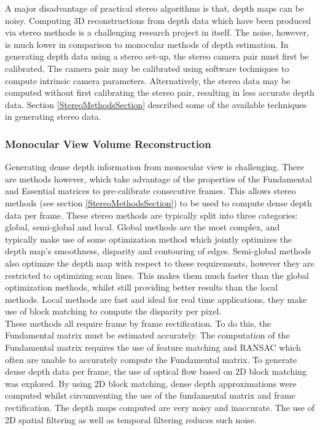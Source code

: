 A major disadvantage of practical stereo algorithms is that, depth maps can be noisy. Computing 3D reconstructions from depth data which have been produced via stereo methods is a challenging research project in itself. The noise, however, is much lower in comparison to monocular methods of depth estimation. In generating depth data using a stereo set-up, the stereo camera pair must first be calibrated. The camera pair may be calibrated using software techniques to compute intrinsic camera parameters. Alternatively, the stereo data may be computed without first calibrating the stereo pair, resulting in less accurate depth data. Section \ref{StereoMethodsSection} described some of the available techniques in generating stereo data. \\

\subsubsection{Monocular View Volume Reconstruction}
\label{subsec:MVVRMethodology}

Generating dense depth information from monocular view is challenging. There are methods however, which take advantage of the properties of the Fundamental and Essential matrices to pre-calibrate consecutive frames. This allows stereo methods (see section \ref{StereoMethodsSection}) to be used to compute dense depth data per frame. These stereo methods are typically split into three categories: global, semi-global and local. Global methods are the most complex, and typically make use of some optimization method which jointly optimizes the depth map's smoothness, disparity and contouring of edges. Semi-global methods also optimize the depth map with respect to these requirements, however they are restricted to optimizing scan lines. This makes them much faster than the global optimization methods, whilst still providing better results than the local methods. Local methods are fast and ideal for real time applications, they make use of block matching to compute the disparity per pixel. \\

These methods all require frame by frame rectification. To do this, the Fundamental matrix must be estimated accurately. The computation of the Fundamental matrix requires the use of feature matching and RANSAC which often are unable to accurately compute the Fundamental matrix. To generate dense depth data per frame, the use of optical flow based on 2D block matching was explored. By using 2D block matching, dense depth approximations were computed whilst circumventing the use of the fundamental matrix and frame rectification. The depth maps computed are very noisy and inaccurate. The use of 2D spatial filtering as well as temporal filtering reduces such noise. \\


